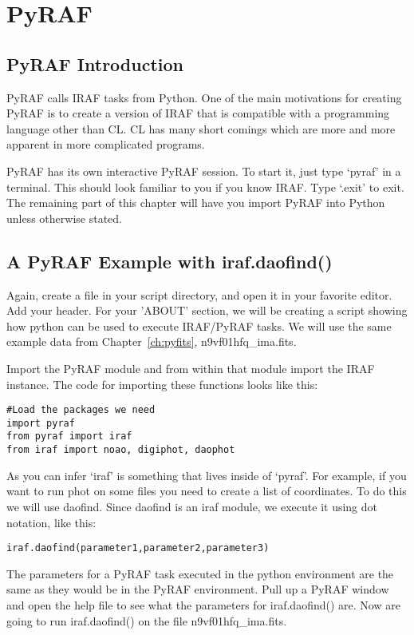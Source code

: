 \chapter{PyRAF}
\label{ch:pyraf}
 
\section{PyRAF Introduction}

PyRAF calls IRAF tasks from Python.  One of the main motivations for
creating PyRAF is to create a version of IRAF that is compatible with
a programming language other than CL. CL has many short comings which
are more and more apparent in more complicated programs.

PyRAF has its own interactive PyRAF session.  To start it, just type
`pyraf' in a terminal.  This should look familiar to you if you know
IRAF.  Type `.exit' to exit.  The remaining part of this chapter will
have you import PyRAF into Python unless otherwise stated.

\section{A PyRAF Example with {\sf iraf.daofind()}}

Again, create a file in your script directory, and open it in your
favorite editor.  Add your header.  For your 'ABOUT' section, we will
be creating a script showing how python can be used to execute
IRAF/PyRAF tasks. We will use the same example data from
Chapter~\ref{ch:pyfits}, n9vf01hfq\_ima.fits.

Import the PyRAF module and from within that module import the IRAF
instance.  The code for importing these functions looks like this:

\begin{verbatim}
#Load the packages we need 
import pyraf 
from pyraf import iraf
from iraf import noao, digiphot, daophot
\end{verbatim}

As you can infer `iraf' is something that lives inside of `pyraf'.
For example, if you want to run {\sf\small phot} on some files you
need to create a list of coordinates.  To do this we will use
{\sf\small daofind}.  Since {\sf\small daofind} is an iraf module, we
execute it using dot notation, like this:

\texttt{iraf.daofind(parameter1,parameter2,parameter3)}

The parameters for a PyRAF task executed in the python environment are
the same as they would be in the PyRAF environment. Pull up a PyRAF
window and open the help file to see what the parameters for
{\sf\small iraf.daofind()} are. Now are going to run {\sf\small
  iraf.daofind()} on the file n9vf01hfq\_ima.fits.  


